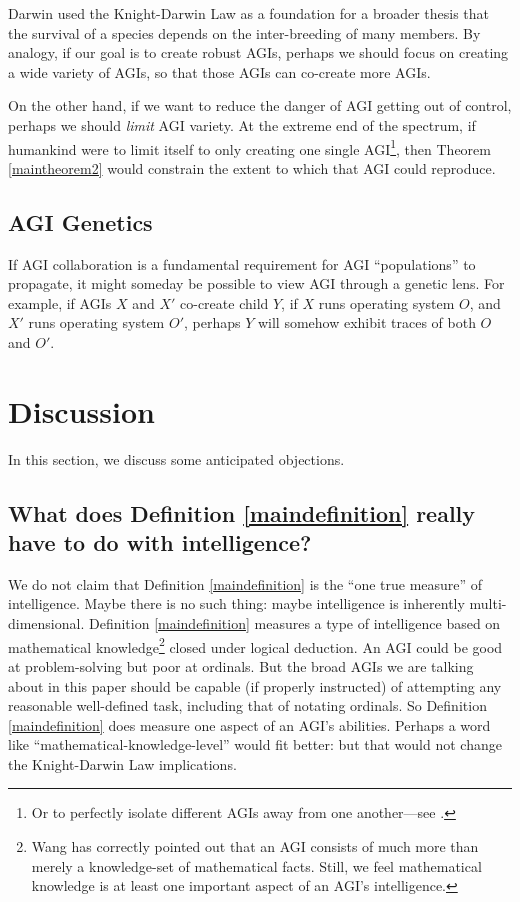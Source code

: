 \documentclass[runningheads]{llncs}
\begin{document}
Darwin used the Knight-Darwin Law as a foundation for
a broader thesis that the survival of a
species depends on the inter-breeding of many members.
By analogy, if our goal is to create robust AGIs, perhaps
we should focus on creating a wide variety of AGIs, so that
those AGIs can co-create more AGIs.

On the other hand, if we want to reduce the danger of AGI getting out of control,
perhaps we should \emph{limit} AGI variety. At the extreme end
of the spectrum, if humankind were to limit itself to only creating one single
AGI\footnote{Or to perfectly isolate
different AGIs away from
one another---see \cite{yampolskiy2012leakproofing}.}, then
Theorem \ref{maintheorem2} would constrain the extent to which
that AGI could reproduce.


\subsection{AGI Genetics}

If AGI collaboration
is a fundamental requirement for AGI ``populations'' to propagate, it might
someday be possible to view AGI through a genetic lens. For example, if AGIs $X$ and $X'$
co-create child $Y$,
if $X$ runs operating
system $O$, and $X'$ runs operating system $O'$, perhaps $Y$
will somehow exhibit traces of both $O$ and $O'$.


\section{Discussion}
\label{objectionsection}

In this section, we discuss some anticipated objections.

\subsection{What does Definition \ref{maindefinition} really have to do with intelligence?}

We do not claim that Definition \ref{maindefinition} is the ``one true measure'' of
intelligence. Maybe there is no such thing: maybe intelligence is inherently
multi-dimensional. Definition \ref{maindefinition} measures a type of
intelligence based on mathematical knowledge\footnote{Wang has
correctly pointed out \cite{wang2007} that an AGI consists of much more than merely
a knowledge-set of mathematical facts. Still, we feel mathematical knowledge is at least
one important aspect of an AGI's intelligence.} closed under logical deduction. An
AGI could be good at problem-solving
but poor at ordinals. But the broad AGIs we are talking about in this paper
should be capable (if properly
instructed) of attempting any reasonable well-defined task, including that of
notating ordinals. So Definition \ref{maindefinition} does
measure one aspect of an AGI's abilities. Perhaps
a word like
``mathematical-knowledge-level'' would fit better: but
that would not change
the Knight-Darwin Law implications.
\end{document}
